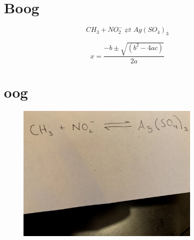 \documentclass[a4paper, 12pt, titlepage, legno]{article}
\begin{document}
\tableofcontents

\newpage

\section{Boog}
\begin{equation}
C H_{3}+N O_{2}^{-} \rightleftarrows Ag\left(S O_{4}\right)_{3}
\end{equation}

\begin{equation}
x=\frac{-b \pm \sqrt{\left(b^{2}-4 a c\right)}}{2 a}
\end{equation}

\section{oog}
\begin{figure}[ht!]
\centering
\includegraphics[width=90mm]{./imgs/IMG_8642.jpg}
\end{figure}
\end{document}
